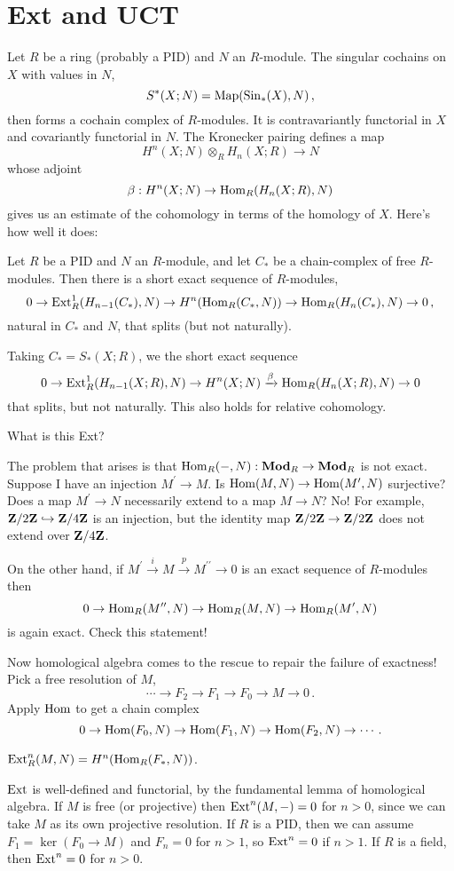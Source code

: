 \section{Ext and UCT}
Let $R$ be a ring (probably a PID) and $N$ an $R$-module. The singular cochains
on $X$ with values in $N$, 
\[S^\ast(X;N)=\operatorname{Map}(\mathrm{Sin}_\ast(X),N)\,,
\]
then forms a cochain complex of $R$-modules. It is contravariantly functorial
in $X$ and covariantly functorial in $N$. The Kronecker pairing defines a map
\[
H^n(X;N)\otimes_R H_n(X;R)\to N
\]
whose adjoint 
\[
\beta:H^n(X;N)\rightarrow\operatorname{Hom}_R( H_n(X;R),N)
\]
gives us an estimate of the cohomology in terms of the homology of $X$. 
Here's how well it does:
\begin{theorem}
\label{thm-mvuct}
Let $R$ be a PID and $N$ an $R$-module, and let $C_*$ 
be a chain-complex of free $R$-modules. Then there is a short exact sequence
of $R$-modules,
\[
0\to\operatorname{Ext}_R^1(H_{n-1}(C_*),N)\to H^n(\operatorname{Hom}_R(C_*,N))\to\operatorname{Hom}_R(H_n(C_*),N)\to0\,,
\]
natural in $C_*$ and $N$, that splits (but not naturally). 
\end{theorem}
Taking $C_*=S_*(X;R)$, we the short exact sequence
\begin{equation*}
0\to\operatorname{Ext}^1_R( H_{n-1}(X;R),N)\to H^n(X;N)\xrightarrow{\beta}\operatorname{Hom}_R( H_n(X;R),N)\to 0
\end{equation*}
that splits, but not naturally. This also holds for relative cohomology.

What is this Ext?

The problem that arises is that $\operatorname{Hom}_R(-,N):\mathbf{Mod}_R\to\mathbf{Mod}_R$ is not exact. 
Suppose I have an injection $M^\prime\to M$. Is $\operatorname{Hom}(M,N)\to\operatorname{Hom}(M^\prime,N)$ surjective? Does a map $M^\prime\to N$ necessarily extend to a map $M\to N$? No! For example, $\mathbf Z/2\mathbf Z\hookrightarrow\mathbf Z/4\mathbf Z$ is an injection, but the identity
map $\mathbf Z/2\mathbf Z\to\mathbf Z/2\mathbf Z$ does not extend over $\mathbf Z/4\mathbf Z$. 

On the other hand, if $M^\prime\xrightarrow{i} M\xrightarrow{p} M^{\prime\prime}\to 0$ is an exact sequence of $R$-modules then 
\[
0\to \operatorname{Hom}_R(M^{\prime\prime},N)\to\operatorname{Hom}_R(M,N)\to \operatorname{Hom}_R(M^{\prime},N)
\]
is again exact. Check this statement! 

Now homological algebra comes to the rescue to repair the failure of exactness! Pick a free resolution of $M$,
\[
\cdots\to F_2\to F_1\to F_0\to M\to 0\,.
\]
Apply $\operatorname{Hom}$ to get a chain complex 
\[
0\to \operatorname{Hom}(F_0,N)\to \operatorname{Hom}(F_1,N)\to \operatorname{Hom}(F_2,N)\to\cdots\,.
\]
\begin{definition} 
$\operatorname{Ext}_R^n(M,N)= H^n(\operatorname{Hom}_R(F_\ast,N))$.
\end{definition}
\begin{remark}
$\operatorname{Ext}$ is well-defined and functorial, by the fundamental lemma of homological algebra. If $M$ is free (or projective) then $\operatorname{Ext}^n(M,-)=0$ for $n>0$, since we can take $M$ as its own projective resolution. If $R$ is a PID, then we can assume $F_1=\ker(F_0\to M)$ and $F_n=0$ for $n>1$, so $\operatorname{Ext}^n=0$ if $n>1$. If $R$ is a field, then $\operatorname{Ext}^n=0$ for $n>0$. 
\end{remark}

